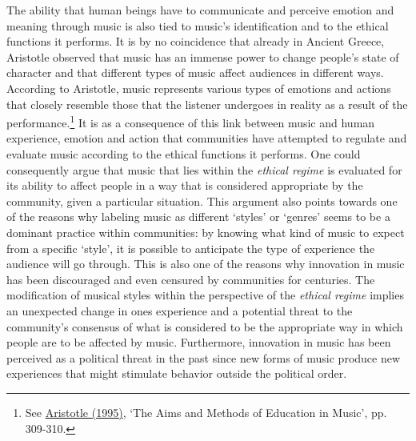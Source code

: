 The ability that human beings have to communicate and perceive emotion and meaning through music is also tied to music's identification and to the ethical functions it performs. It is by no coincidence that already in Ancient Greece, Aristotle observed that music has an immense power to change people's state of character and that different types of music affect audiences in different ways. According to Aristotle, music represents various types of emotions and actions that closely resemble those that the listener undergoes in reality as a result of the performance.\footnote{See \hyperlink{aristotle}{Aristotle (1995)}, `The Aims and Methods of Education in Music', pp. 309-310.} It is as a consequence of this link between music and human experience, emotion and action that communities have attempted to regulate and evaluate music according to the ethical functions it performs. One could consequently argue that music that lies within the \emph{ethical regime} is evaluated for its ability to affect people in a way that is considered appropriate by the community, given a particular situation. This argument also points towards one of the reasons why labeling music as different `styles' or `genres' seems to be a dominant practice within communities: by knowing what kind of music to expect from a specific `style', it is possible to anticipate the type of experience the audience will go through. This is also one of the reasons why innovation in music has been discouraged and even censured by communities for centuries. The modification of musical styles within the perspective of the \emph{ethical regime} implies an unexpected change in ones experience and a potential threat to the community's consensus of what is considered to be the appropriate way in which people are to be affected by music. Furthermore, innovation in music has been perceived as a political threat in the past since new forms of music produce new experiences that might stimulate behavior outside the political order. 

